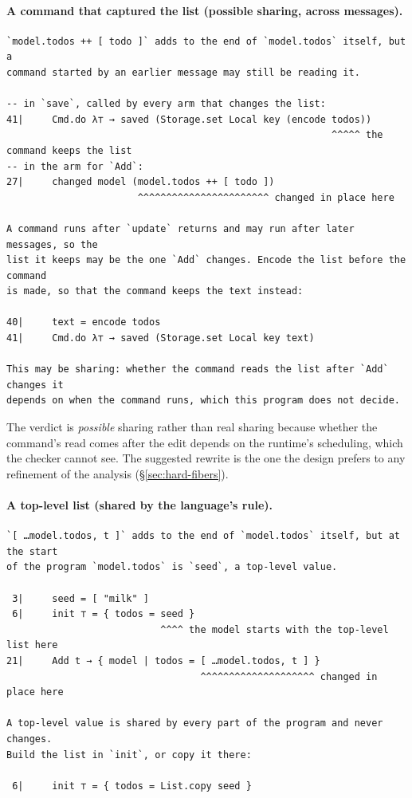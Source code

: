 \paragraph{A command that captured the list (possible sharing, across messages).}
\begin{Verbatim}
`model.todos ++ [ todo ]` adds to the end of `model.todos` itself, but a
command started by an earlier message may still be reading it.

-- in `save`, called by every arm that changes the list:
41|     Cmd.do λ⊤ → saved (Storage.set Local key (encode todos))
                                                         ^^^^^ the command keeps the list
-- in the arm for `Add`:
27|     changed model (model.todos ++ [ todo ])
                       ^^^^^^^^^^^^^^^^^^^^^^^ changed in place here

A command runs after `update` returns and may run after later messages, so the
list it keeps may be the one `Add` changes. Encode the list before the command
is made, so that the command keeps the text instead:

40|     text = encode todos
41|     Cmd.do λ⊤ → saved (Storage.set Local key text)

This may be sharing: whether the command reads the list after `Add` changes it
depends on when the command runs, which this program does not decide.
\end{Verbatim}
The verdict is \emph{possible} sharing rather than real sharing because whether the command's read comes
after the edit depends on the runtime's scheduling, which the checker cannot see. The suggested rewrite
is the one the design prefers to any refinement of the analysis (\S\ref{sec:hard-fibers}).

\paragraph{A top-level list (shared by the language's rule).}
\begin{Verbatim}
`[ …model.todos, t ]` adds to the end of `model.todos` itself, but at the start
of the program `model.todos` is `seed`, a top-level value.

 3|     seed = [ "milk" ]
 6|     init ⊤ = { todos = seed }
                           ^^^^ the model starts with the top-level list here
21|     Add t → { model | todos = [ …model.todos, t ] }
                                  ^^^^^^^^^^^^^^^^^^^^ changed in place here

A top-level value is shared by every part of the program and never changes.
Build the list in `init`, or copy it there:

 6|     init ⊤ = { todos = List.copy seed }
\end{Verbatim}

